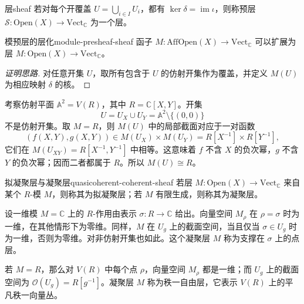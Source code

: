 \begin{definition}{层}{sheaf}
若对每个开覆盖 $U=\bigcup_{i\in I}U_i$，都有 $\ker\delta=\operatorname{im}\iota$，则称预层 $\mathcal S\colon\mathrm{Open}(X)\to\mathrm{Vect}_{\mathbb C}$ 为一个层。
\end{definition}

\begin{lemma}{模预层的层化}{module-presheaf-sheaf}
函子 $M\colon\mathrm{AffOpen}(X)\to\mathrm{Vect}_{\mathbb C}$ 可以扩展为层 $M\colon\mathrm{Open}(X)\to\mathrm{Vect}_{\mathbb C}$。
\end{lemma}
\begin{proof}[证明思路]
对任意开集 $U$，取所有包含于 $U$ 的仿射开集作为覆盖，并定义 $M(U)$ 为相应映射 $\delta$ 的核。
\end{proof}

\begin{example}[仿射平面上的非仿射开集]
考察仿射平面 $\mathbb A^2=V(R)$，其中 $R=\mathbb C[X,Y]$。开集
\[
  U=U_X\cup U_Y=\mathbb A^2\setminus\{(0,0)\}
\]
不是仿射开集。取 $M=R$，则 $M(U)$ 中的局部截面对应于一对函数
\[
  (f(X,Y),g(X,Y))\in M(U_X)\times M(U_Y)
  =R[X^{-1}]\times R[Y^{-1}],
\]
它们在 $M(U_{XY})=R[X^{-1},Y^{-1}]$ 中相等。这意味着 $f$ 不含 $X$ 的负次幂，$g$ 不含 $Y$ 的负次幂；因而二者都属于 $R$。所以 $M(U)\cong R$。
\end{example}

\begin{definition}{拟凝聚层与凝聚层}{quasicoherent-coherent-sheaf}
若层 $M\colon\mathrm{Open}(X)\to\mathrm{Vect}_{\mathbb C}$ 来自某个 $R$-模 $M$，则称其为拟凝聚层；若 $M$ 有限生成，则称其为凝聚层。
\end{definition}

\begin{example}[点上的点层]
设一维模 $M=\mathbb C$ 上的 $R$-作用由表示 $\sigma\colon R\to\mathbb C$ 给出。向量空间 $M_\rho$ 在 $\rho=\sigma$ 时为一维，在其他情形下为零维。同样，$M$ 在 $U_g$ 上的截面空间，当且仅当 $\sigma\in U_g$ 时为一维，否则为零维。对非仿射开集也如此。这个凝聚层 $M$ 称为支撑在 $\sigma$ 上的点层。
\end{example}

\begin{example}[秩一自由层]
若 $M=R$，那么对 $V(R)$ 中每个点 $\rho$，向量空间 $M_\rho$ 都是一维；而 $U_g$ 上的截面空间为 $\mathcal O(U_g)=R[g^{-1}]$。凝聚层 $M$ 称为秩一自由层，它表示 $V(R)$ 上的平凡秩一向量丛。
\end{example}

